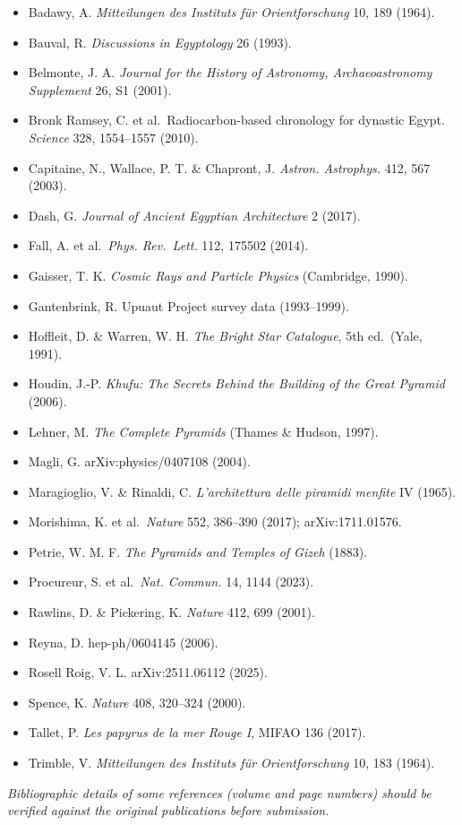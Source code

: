 \documentclass[
  11pt,
]{article}
\providecommand{\tightlist}{%
  \setlength{\itemsep}{0pt}\setlength{\parskip}{0pt}}
\begin{document}
\begin{itemize}
\tightlist
\item
  Badawy, A. \emph{Mitteilungen des Instituts für Orientforschung} 10,
  189 (1964).
\item
  Bauval, R. \emph{Discussions in Egyptology} 26 (1993).
\item
  Belmonte, J. A. \emph{Journal for the History of Astronomy,
  Archaeoastronomy Supplement} 26, S1 (2001).
\item
  Bronk Ramsey, C. et al.~Radiocarbon-based chronology for dynastic
  Egypt. \emph{Science} 328, 1554--1557 (2010).
\item
  Capitaine, N., Wallace, P. T. \& Chapront, J. \emph{Astron.
  Astrophys.} 412, 567 (2003).
\item
  Dash, G. \emph{Journal of Ancient Egyptian Architecture} 2 (2017).
\item
  Fall, A. et al.~\emph{Phys. Rev.~Lett.} 112, 175502 (2014).
\item
  Gaisser, T. K. \emph{Cosmic Rays and Particle Physics} (Cambridge,
  1990).
\item
  Gantenbrink, R. Upuaut Project survey data (1993--1999).
\item
  Hoffleit, D. \& Warren, W. H. \emph{The Bright Star Catalogue}, 5th
  ed.~(Yale, 1991).
\item
  Houdin, J.-P. \emph{Khufu: The Secrets Behind the Building of the
  Great Pyramid} (2006).
\item
  Lehner, M. \emph{The Complete Pyramids} (Thames \& Hudson, 1997).
\item
  Magli, G. arXiv:physics/0407108 (2004).
\item
  Maragioglio, V. \& Rinaldi, C. \emph{L'architettura delle piramidi
  menfite} IV (1965).
\item
  Morishima, K. et al.~\emph{Nature} 552, 386--390 (2017);
  arXiv:1711.01576.
\item
  Petrie, W. M. F. \emph{The Pyramids and Temples of Gizeh} (1883).
\item
  Procureur, S. et al.~\emph{Nat. Commun.} 14, 1144 (2023).
\item
  Rawlins, D. \& Pickering, K. \emph{Nature} 412, 699 (2001).
\item
  Reyna, D. hep-ph/0604145 (2006).
\item
  Rosell Roig, V. L. arXiv:2511.06112 (2025).
\item
  Spence, K. \emph{Nature} 408, 320--324 (2000).
\item
  Tallet, P. \emph{Les papyrus de la mer Rouge I}, MIFAO 136 (2017).
\item
  Trimble, V. \emph{Mitteilungen des Instituts für Orientforschung} 10,
  183 (1964).
\end{itemize}

\emph{Bibliographic details of some references (volume and page numbers)
should be verified against the original publications before submission.}
\end{document}
